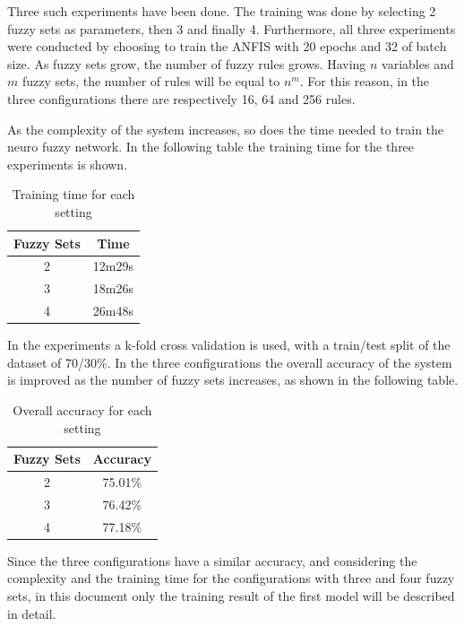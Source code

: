 \documentclass[10pt,twocolumn,letterpaper]{article}
\begin{document}
Three such experiments have been done. The training was done by selecting 2 fuzzy sets as parameters, then 3 and finally 4. Furthermore, all three experiments were conducted by choosing to train the ANFIS with 20 epochs and 32 of batch size.
As fuzzy sets grow, the number of fuzzy rules grows. Having $n$ variables and $m$ fuzzy sets, the number of rules will be equal to $n^{m}$. For this reason, in the three configurations there are respectively 16, 64 and 256 rules.

As the complexity of the system increases, so does the time needed to train the neuro fuzzy network. In the following table the training time for the three experiments is shown.

\begin{table}[h!]
\centering
\begin{tabular}{||c c||} 
 \hline
 Fuzzy Sets & Time \\ [0.5ex] 
 \hline\hline
 2 & 12m29s \\ 
 3 & 18m26s \\
 4 & 26m48s \\  [1ex] 
 \hline
\end{tabular}
\caption{Training time for each setting}
\label{table:2}
\end{table}

In the experiments a k-fold cross validation is used, with a train/test split of the dataset of 70/30\%. In the three configurations the overall accuracy of the system is improved as the number of fuzzy sets increases, as shown in the following table. 
\begin{table}[h!]
\centering
\begin{tabular}{||c c||} 
 \hline
 Fuzzy Sets & Accuracy \\ [0.5ex] 
 \hline\hline
 2 & 75.01\% \\ 
 3 & 76.42\% \\
 4 & 77.18\% \\  [1ex] 
 \hline
\end{tabular}
\caption{Overall accuracy for each setting}
\label{table:2}
\end{table}

Since the three configurations have a similar accuracy, and considering the complexity and the training time for the configurations with three and four fuzzy sets, in this document only the training result of the first model will be described in detail.
\end{document}
